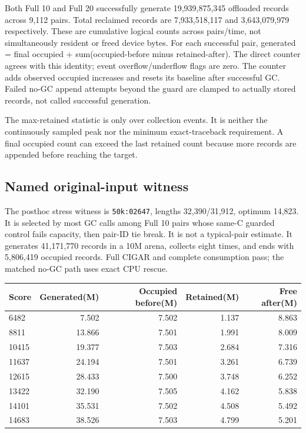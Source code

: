\documentclass[11pt,a4paper]{article}
\begin{document}
Both Full 10 and Full 20 successfully generate 19,939,875,345 offloaded records across 9,112 pairs. Total reclaimed records are 7,933,518,117 and 3,643,079,979 respectively. These are cumulative logical counts across pairs/time, not simultaneously resident or freed device bytes. For each successful pair, generated = final occupied + sum(occupied-before minus retained-after). The direct counter agrees with this identity; event overflow/underflow flags are zero. The counter adds observed occupied increases and resets its baseline after successful GC. Failed no-GC append attempts beyond the guard are clamped to actually stored records, not called successful generation.

The max-retained statistic is only over collection events. It is neither the continuously sampled peak nor the minimum exact-traceback requirement. A final occupied count can exceed the last retained count because more records are appended before reaching the target.

\subsection{Named original-input witness}
The posthoc stress witness is \texttt{50k:02647}, lengths 32,390/31,912, optimum 14,823. It is selected by most GC calls among Full 10 pairs whose same-C guarded control fails capacity, then pair-ID tie break. It is not a typical-pair estimate. It generates 41,171,770 records in a 10M arena, collects eight times, and ends with 5,806,419 occupied records. Full CIGAR and complete consumption pass; the matched no-GC path uses exact CPU rescue.
\begin{center}\small\begin{tabular}{lrrrr}\toprule
Score & Generated(M) & Occupied before(M) & Retained(M) & Free after(M)\\\midrule
6482 & 7.502 & 7.502 & 1.137 & 8.863\\
8811 & 13.866 & 7.501 & 1.991 & 8.009\\
10415 & 19.377 & 7.503 & 2.684 & 7.316\\
11637 & 24.194 & 7.501 & 3.261 & 6.739\\
12615 & 28.433 & 7.500 & 3.748 & 6.252\\
13422 & 32.190 & 7.505 & 4.162 & 5.838\\
14101 & 35.531 & 7.502 & 4.508 & 5.492\\
14683 & 38.526 & 7.503 & 4.799 & 5.201\\
\bottomrule\end{tabular}\end{center}
\end{document}
